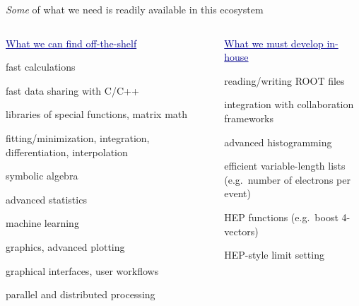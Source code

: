 \documentclass[aspectratio=169]{beamer}
\begin{document}
\begin{frame}{{\it Some} of what we need is readily available in this ecosystem}
\vspace{-0.5 cm}
\begin{columns}[t]
\begin{center}
\textcolor{darkblue}{\underline{\large What we can find off-the-shelf}}

\vspace{0.18 cm}
fast calculations

\vspace{0.18 cm}
fast data sharing with C/C++

\vspace{0.18 cm}
libraries of special functions, matrix math

\vspace{0.18 cm}
fitting/minimization, integration, differentiation, interpolation

\vspace{0.18 cm}
symbolic algebra

\vspace{0.18 cm}
advanced statistics

\vspace{0.18 cm}
machine learning

\vspace{0.18 cm}
graphics, advanced plotting

\vspace{0.18 cm}
graphical interfaces, user workflows

\vspace{0.18 cm}
parallel and distributed processing
\end{center}

\begin{center}
\textcolor{darkblue}{\underline{\large What we must develop in-house}}

\vspace{0.18 cm}
reading/writing ROOT files

\vspace{0.18 cm}
integration with collaboration frameworks

\vspace{0.18 cm}
advanced histogramming

\vspace{0.18 cm}
efficient variable-length lists \\ (e.g.\ number of electrons per event)

\vspace{0.18 cm}
HEP functions (e.g.\ boost 4-vectors)

\vspace{0.18 cm}
HEP-style limit setting
\end{center}
\end{columns}
\end{frame}
\end{document}

